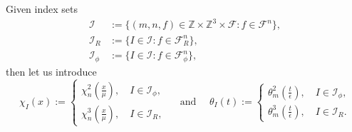 \documentclass[10pt,a4paper]{amsart}
\numberwithin{equation}{section}
\numberwithin{corollario}{section}
\numberwithin{lemma}{section}
\numberwithin{prop}{section}
\theoremstyle{definition}
\theoremstyle{remark}
\newcommand{\Z}{\mathbb{Z}}
\newcommand{\F}{\mathcal{F}}
\newcommand{\I}{\mathcal{I}}
\begin{document}
Given index sets 
\begin{equation}
\begin{aligned}
  \I &:= 
  \{(m,n,f)\in \Z\times\Z^3\times\F:f\in\F^n\},
  \\
  \I_R &:= 
  \{I\in\I:f\in\F_R^n\},
  \\
  \I_{\phi} &:=\{I\in\I:f\in\F_{\phi}^n\},  
\end{aligned}
\end{equation}
then let us introduce
\begin{equation}
\chi_I(x):=\begin{cases}
        \chi_n^2(\frac{x}{\mu}),\quad I\in\I_{\phi},\\
        \chi_n^3(\frac{x}{\mu}),\quad I\in\I_{R},
    \end{cases}
    \quad
    \mbox{ and }
    \quad
    \theta_I(t):=\begin{cases}
        \theta_m^2(\frac{t}{\epsilon}),\quad I\in\I_{\phi},\\
        \theta_m^3(\frac{t}{\epsilon}),\quad I\in\I_{R}.
    \end{cases}
\end{equation}
\end{document}

